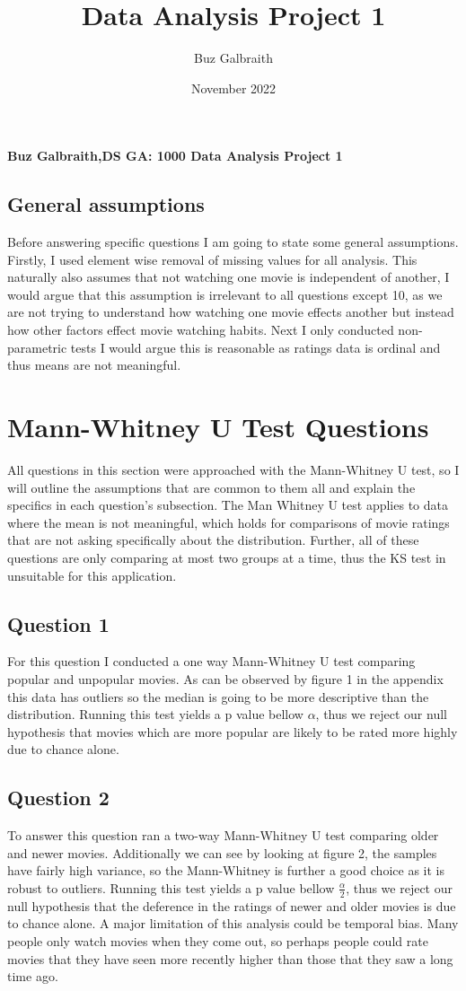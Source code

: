 \documentclass{article}
\title{Data Analysis Project 1}
\author{Buz Galbraith }
\date{November 2022}
\begin{document}
\textbf{Buz Galbraith,DS GA: 1000 Data Analysis Project 1}

\subsection*{General assumptions}
\small{
Before answering specific questions I am going to state some general assumptions. Firstly, I used element wise removal of missing values for all analysis. 
This naturally also assumes that not watching one movie is independent of another, I would argue that this assumption is irrelevant to all questions except 10, as we are not trying to understand how watching one movie effects another but instead how other factors effect movie watching habits. Next I only conducted non-parametric tests I would argue this is reasonable as ratings data is ordinal and thus means are not meaningful.  }  

\section*{Mann-Whitney U Test Questions}
All questions in this section were approached with the Mann-Whitney U test, so I will outline the assumptions that are common to them all and explain the specifics in each question's subsection. The Man Whitney U test applies to data where the mean is not meaningful, which holds for comparisons of movie ratings that are not asking specifically about the distribution. Further, all of these questions are only comparing at most two groups at a time, thus the KS test in unsuitable for this application. 
\subsection*{Question 1}
For this question I conducted a one way Mann-Whitney U test comparing popular and unpopular movies. As can be observed by figure 1 in the appendix this data has outliers so the median is going to be more descriptive than the distribution. Running this test yields a p value bellow ${\alpha}$, thus we reject our null hypothesis that movies which are more popular are likely to be rated more highly due to chance alone. %
\subsection*{Question 2}
To answer this question ran a two-way Mann-Whitney U test comparing older and newer movies. Additionally we can see by looking at figure 2, the samples have fairly high variance, so the Mann-Whitney is further a good choice as it is robust to outliers.  Running this test yields a p value bellow $\frac{\alpha}{2}$, thus we reject our null hypothesis that the deference in the ratings of newer and older movies is due to chance alone. A major limitation of this analysis could be temporal bias. Many people only watch movies when they come out, so perhaps people could rate movies that they have seen more recently higher than those that they saw a long time ago. 
\end{document}
